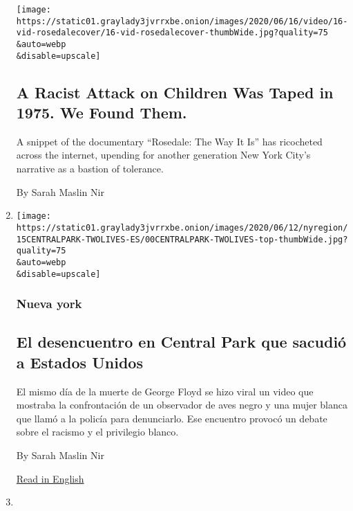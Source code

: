 \begin{enumerate}
  \texttt{[image: https://static01.graylady3jvrrxbe.onion/images/2020/06/16/video/16-vid-rosedalecover/16-vid-rosedalecover-thumbWide.jpg?quality=75\\\&auto=webp\\\&disable=upscale]}

  \hypertarget{a-racist-attack-on-children-was-taped-in-1975-we-found-them}{%
  \subsection{A Racist Attack on Children Was Taped in 1975. We Found
  Them.}\label{a-racist-attack-on-children-was-taped-in-1975-we-found-them}}

  A snippet of the documentary ``Rosedale: The Way It Is'' has
  ricocheted across the internet, upending for another generation New
  York City's narrative as a bastion of tolerance.

  By Sarah Maslin Nir
\item
  \href{/es/2020/06/15/espanol/central-park-racismo-amy-cooper.html}{}

  \texttt{[image: https://static01.graylady3jvrrxbe.onion/images/2020/06/12/nyregion/15CENTRALPARK-TWOLIVES-ES/00CENTRALPARK-TWOLIVES-top-thumbWide.jpg?quality=75\\\&auto=webp\\\&disable=upscale]}

  \hypertarget{nueva-york}{%
  \subsubsection{Nueva york}\label{nueva-york}}

  \hypertarget{el-desencuentro-en-central-park-que-sacudiuxf3-a-estados-unidos}{%
  \subsection{El desencuentro en Central Park que sacudió a Estados
  Unidos}\label{el-desencuentro-en-central-park-que-sacudiuxf3-a-estados-unidos}}

  El mismo día de la muerte de George Floyd se hizo viral un video que
  mostraba la confrontación de un observador de aves negro y una mujer
  blanca que llamó a la policía para denunciarlo. Ese encuentro provocó
  un debate sobre el racismo y el privilegio blanco.

  By Sarah Maslin Nir

  \href{https://www.nytimes3xbfgragh.onion/2020/06/14/nyregion/central-park-amy-cooper-christian-racism.html}{Read
  in English}
\item
  \href{/2020/06/14/nyregion/central-park-amy-cooper-christian-racism.html}{}


\end{enumerate}
